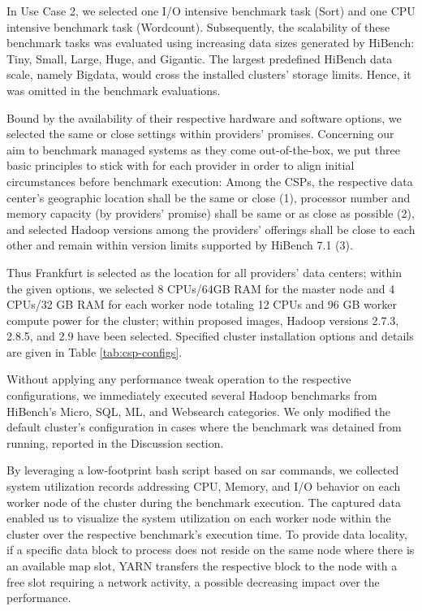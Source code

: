 \documentclass[review]{elsarticle}
\begin{document}
In Use Case 2, we selected one I/O intensive benchmark task (Sort) and one CPU intensive benchmark task (Wordcount). Subsequently, the scalability of these benchmark tasks was evaluated using increasing data sizes generated by HiBench: Tiny, Small, Large, Huge, and Gigantic. The largest predefined HiBench data scale, namely Bigdata, would cross the installed clusters' storage limits. Hence, it was omitted in the benchmark evaluations.

Bound by the availability of their respective hardware and software options, we selected the same or close settings within providers' promises. Concerning our aim to benchmark managed systems as they come out-of-the-box, we put three basic principles to stick with for each provider in order to align initial circumstances before benchmark execution: Among the CSPs, the respective data center's geographic location shall be the same or close (1), processor number and memory capacity (by providers' promise) shall be same or as close as possible (2), and selected Hadoop versions among the providers' offerings shall be close to each other and remain within version limits supported by HiBench 7.1 (3). 

Thus Frankfurt is selected as the location for all providers' data centers; within the given options, we selected 8 CPUs/64GB RAM for the master node and 4 CPUs/32 GB RAM for each worker node totaling 12 CPUs and 96 GB worker compute power for the cluster; within proposed images, Hadoop versions 2.7.3, 2.8.5, and 2.9 have been selected. Specified cluster installation options and details are given in Table \ref{tab:csp-configs}.

Without applying any performance tweak operation to the respective configurations, we immediately executed several Hadoop benchmarks from HiBench's Micro, SQL, ML, and Websearch categories. We only modified the default cluster's configuration in cases where the benchmark was detained from running, reported in the Discussion section.

By leveraging a low-footprint bash script based on sar commands, we collected system utilization records addressing CPU, Memory, and I/O behavior on each worker node of the cluster during the benchmark execution. The captured data enabled us to visualize the system utilization on each worker node within the cluster over the respective benchmark's execution time. To provide data locality, if a specific data block to process does not reside on the same node where there is an available map slot, YARN transfers the respective block to the node with a free slot requiring a network activity, a possible decreasing impact over the performance. 
\end{document}
